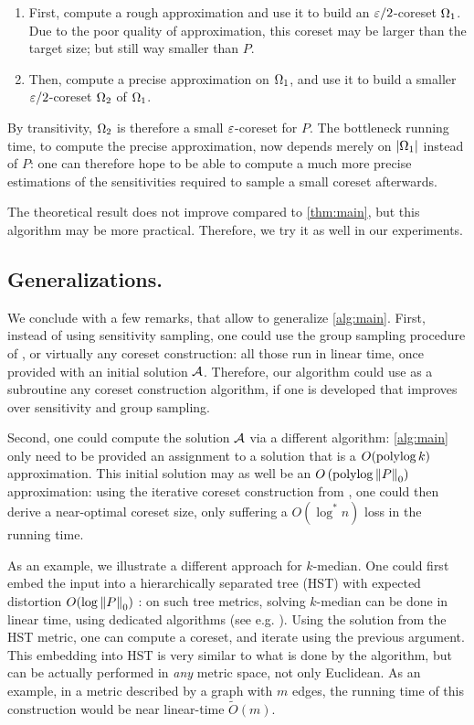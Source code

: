 \begin{enumerate}
\item First, compute a rough approximation and use it to build an $\varepsilon/2$-coreset $\Omega_1$. Due to the poor quality of approximation, this coreset may be larger than the target size; but still way smaller than $P$.
\item  Then, compute a precise approximation on $\Omega_1$, and use it to build a smaller $\varepsilon/2$-coreset $\Omega_2$ of $\Omega_1$. 
\end{enumerate}
By transitivity, $\Omega_2$ is therefore a small $\varepsilon$-coreset for $P$. The bottleneck running time, to compute the precise approximation, now depends merely on $|\Omega_1|$ instead of $P$: one can therefore hope to be able to compute a much more precise estimations of the sensitivities required to sample a small coreset afterwards.

The theoretical result does not improve compared to \cref{thm:main}, but this algorithm may be more practical. Therefore, we try it as well in our experiments.


\subsection{Generalizations.} 
We conclude with a few remarks, that allow to generalize \cref{alg:main}.
First, instead of using sensitivity sampling, one could use the group sampling procedure of \cite{stoc21}, or virtually any coreset construction: all those run in linear time, once provided with an initial solution $\mathcal A$. 
Therefore, our algorithm could use as a subroutine any coreset construction algorithm, if one is developed that improves over sensitivity and group sampling.

Second, one could compute the solution $\mathcal A$ via a different algorithm: \cref{alg:main} only need to be provided an assignment to a solution that is a $O(\operatorname{polylog} k)$ approximation. 
This initial solution may as well be an $O\left(\operatorname{polylog} \left\| P \right\|_0 \right)$ approximation: using the iterative coreset construction from \cite{BravermanJKW21}, one could then derive a near-optimal coreset size, only suffering a $O(\log^* n)$ loss in the running time.

As an example, we illustrate a different approach for $k$-median. One could first embed the input into a hierarchically separated tree (HST) with expected distortion $O(\log \left\| P \right\|_0)$ \cite{}: on such tree metrics, solving $k$-median can be done in linear time, using dedicated algorithms (see e.g. \cite{}). Using the solution from the HST metric, one can compute a coreset, and iterate using the previous argument.
This embedding into HST is very similar to what is done by the \fkmeans algorithm, but can be actually performed in \emph{any} metric space, not only Euclidean. 
As an example, in a metric described by a graph with $m$ edges, the running time of this construction would be near linear-time $\tilde O(m)$.